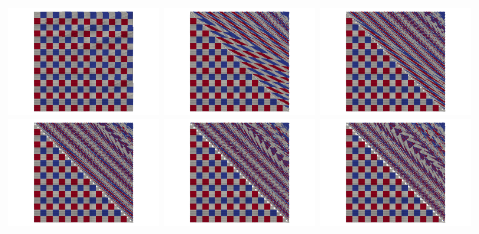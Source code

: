 \begin{center}
\includegraphics[width=4cm]{python_codes/fieldstone_30/results_couette/particles0000}
\includegraphics[width=4cm]{python_codes/fieldstone_30/results_couette/particles0010}
\includegraphics[width=4cm]{python_codes/fieldstone_30/results_couette/particles0020}\\
\includegraphics[width=4cm]{python_codes/fieldstone_30/results_couette/particles0030}
\includegraphics[width=4cm]{python_codes/fieldstone_30/results_couette/particles0040}
\includegraphics[width=4cm]{python_codes/fieldstone_30/results_couette/particles0050}
\end{center}

